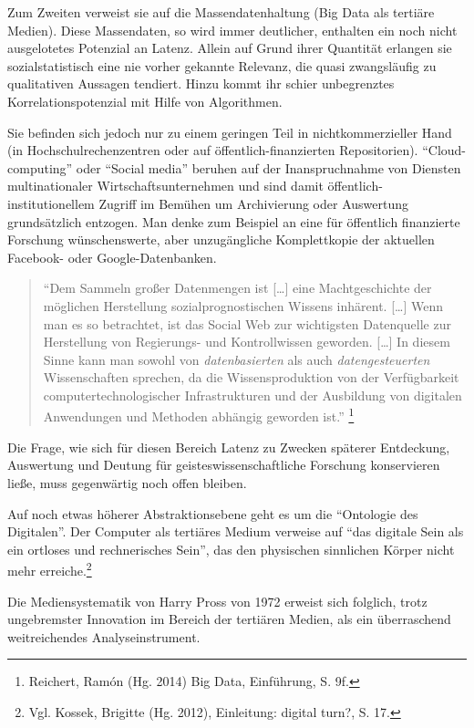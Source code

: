 \documentclass[a4paper,
fontsize=11pt,
oneside,
numbers=noperiodatend,
parskip=half-,
bibliography=totoc,
final
]{scrartcl}
\begin{document}
Zum Zweiten verweist sie auf die Massendatenhaltung (Big Data als
tertiäre Medien). Diese Massendaten, so wird immer deutlicher, enthalten
ein noch nicht ausgelotetes Potenzial an Latenz. Allein auf Grund ihrer
Quantität erlangen sie sozialstatistisch eine nie vorher gekannte
Relevanz, die quasi zwangsläufig zu qualitativen Aussagen tendiert.
Hinzu kommt ihr schier unbegrenztes Korrelationspotenzial mit Hilfe von
Algorithmen.

Sie befinden sich jedoch nur zu einem geringen Teil in
nichtkommerzieller Hand (in Hochschulrechenzentren oder auf
öffentlich-finanzierten Repositorien). \enquote{Cloud-computing} oder
\enquote{Social media} beruhen auf der Inanspruchnahme von Diensten
multinationaler Wirtschaftsunternehmen und sind damit
öffentlich-institutionellem Zugriff im Bemühen um Archivierung oder
Auswertung grundsätzlich entzogen. Man denke zum Beispiel an eine für
öffentlich finanzierte Forschung wünschenswerte, aber unzugängliche
Komplettkopie der aktuellen Facebook- oder Google-Datenbanken.

\begin{quote}
\enquote{Dem Sammeln großer Datenmengen ist {[}\ldots{}{]} eine
Machtgeschichte der möglichen Herstellung sozialprognostischen Wissens
inhärent. {[}\ldots{}{]} Wenn man es so betrachtet, ist das Social Web
zur wichtigsten Datenquelle zur Herstellung von Regierungs- und
Kontrollwissen geworden. {[}\ldots{}{]} In diesem Sinne kann man sowohl
von \emph{datenbasierten} als auch \emph{datengesteuerten}
Wissenschaften sprechen, da die Wissensproduktion von der Verfügbarkeit
computertechnologischer Infrastrukturen und der Ausbildung von digitalen
Anwendungen und Methoden abhängig geworden ist.} \footnote{Reichert,
  Ramón (Hg. 2014) Big Data, Einführung, S. 9f.}
\end{quote}

Die Frage, wie sich für diesen Bereich Latenz zu Zwecken späterer
Entdeckung, Auswertung und Deutung für geisteswissenschaftliche
Forschung konservieren ließe, muss gegenwärtig noch offen bleiben.

Auf noch etwas höherer Abstraktionsebene geht es um die
\enquote{Ontologie des Digitalen}. Der Computer als tertiäres Medium
verweise auf \enquote{das digitale Sein als ein ortloses und
rechnerisches Sein}, das den physischen sinnlichen Körper nicht mehr
erreiche.\footnote{Vgl. Kossek, Brigitte (Hg. 2012), Einleitung: digital
  turn?, S. 17.}

Die Mediensystematik von Harry Pross von 1972 erweist sich folglich,
trotz ungebremster Innovation im Bereich der tertiären Medien, als ein
überraschend weitreichendes Analyseinstrument.
\end{document}
